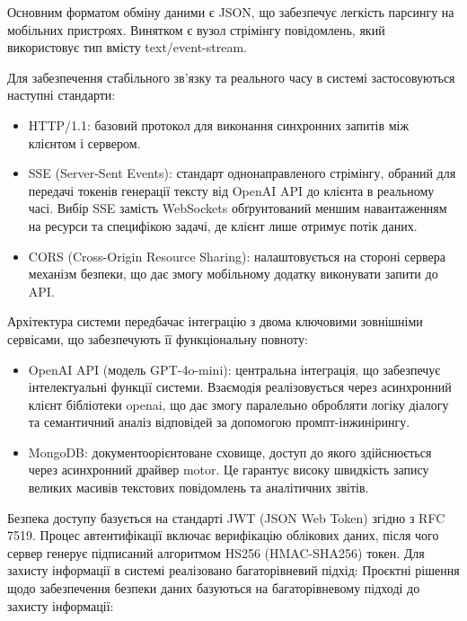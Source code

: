 \documentclass[
]{article}
\begin{document}
Основним форматом обміну даними є JSON, що забезпечує легкість парсингу
на мобільних пристроях. Винятком є вузол стрімінгу повідомлень, який
використовує тип вмісту text/event-stream.

Для забезпечення стабільного зв'язку та реального часу в системі
застосовуються наступні стандарти:

\begin{itemize}
\item
  HTTP/1.1: базовий протокол для виконання синхронних запитів між
  клієнтом і сервером.
\item
  SSE (Server-Sent Events): стандарт однонаправленого стрімінгу, обраний
  для передачі токенів генерації тексту від OpenAI API до клієнта в
  реальному часі. Вибір SSE замість WebSockets обґрунтований меншим
  навантаженням на ресурси та специфікою задачі, де клієнт лише отримує
  потік даних.
\item
  CORS (Cross-Origin Resource Sharing): налаштовується на стороні
  сервера механізм безпеки, що дає змогу мобільному додатку виконувати
  запити до API.
\end{itemize}

Архітектура системи передбачає інтеграцію з двома ключовими зовнішніми
сервісами, що забезпечують її функціональну повноту:

\begin{itemize}
\item
  OpenAI API (модель GPT-4o-mini): центральна інтеграція, що забезпечує
  інтелектуальні функції системи. Взаємодія реалізовується через
  асинхронний клієнт бібліотеки openai, що дає змогу паралельно
  обробляти логіку діалогу та семантичний аналіз відповідей за допомогою
  промпт-інжинірингу.
\item
  MongoDB: документоорієнтоване сховище, доступ до якого здійснюється
  через асинхронний драйвер motor. Це гарантує високу швидкість запису
  великих масивів текстових повідомлень та аналітичних звітів.
\end{itemize}

Безпека доступу базується на стандарті JWT (JSON Web Token) згідно з RFC
7519. Процес автентифікації включає верифікацію облікових даних, після
чого сервер генерує підписаний алгоритмом HS256 (HMAC-SHA256) токен. Для
захисту інформації в системі реалізовано багаторівневий підхід: Проєктні
рішення щодо забезпечення безпеки даних базуються на багаторівневому
підході до захисту інформації:
\end{document}
